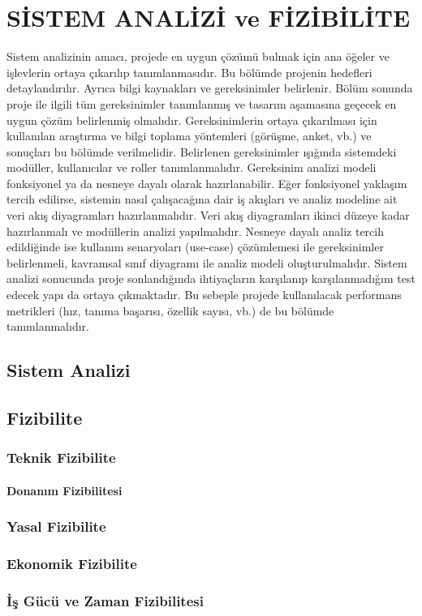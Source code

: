 \chapter{SİSTEM ANALİZİ ve FİZİBİLİTE}
Sistem analizinin amacı, projede en uygun çözümü bulmak için ana öğeler ve işlevlerin ortaya çıkarılıp tanımlanmasıdır. Bu bölümde projenin hedefleri detaylandırılır. Ayrıca bilgi kaynakları ve gereksinimler belirlenir. Bölüm sonunda proje ile ilgili tüm gereksinimler tanımlanmış ve tasarım aşamasına geçecek en uygun çözüm belirlenmiş olmalıdır.
Gereksinimlerin ortaya çıkarılması için kullanılan araştırma ve bilgi toplama yöntemleri (görüşme, anket, vb.) ve sonuçları bu bölümde verilmelidir. Belirlenen gereksinimler ışığında sistemdeki modüller, kullanıcılar ve roller tanımlanmalıdır. Gereksinim analizi modeli fonksiyonel ya da nesneye dayalı olarak hazırlanabilir.
Eğer fonksiyonel yaklaşım tercih edilirse, sistemin nasıl çalışacağına dair iş akışları ve analiz modeline ait veri akış diyagramları hazırlanmalıdır. Veri akış diyagramları ikinci düzeye kadar hazırlanmalı ve modüllerin analizi yapılmalıdır. Nesneye dayalı analiz tercih edildiğinde ise kullanım senaryoları (use-case) çözümlemesi ile gereksinimler belirlenmeli, kavramsal sınıf diyagramı ile analiz modeli oluşturulmalıdır.
Sistem analizi sonucunda proje sonlandığında ihtiyaçların karşılanıp karşılanmadığını test edecek yapı da ortaya çıkmaktadır. Bu sebeple projede kullanılacak performans metrikleri (hız, tanıma başarısı, özellik sayısı, vb.) de bu bölümde tanımlanmalıdır.

\section{Sistem Analizi}

\section{Fizibilite}

\subsection{Teknik Fizibilite}
\subsubsection{Donanım Fizibilitesi}
\subsection{Yasal Fizibilite}
\subsection{Ekonomik Fizibilite}
\subsection{İş Gücü ve Zaman Fizibilitesi}
